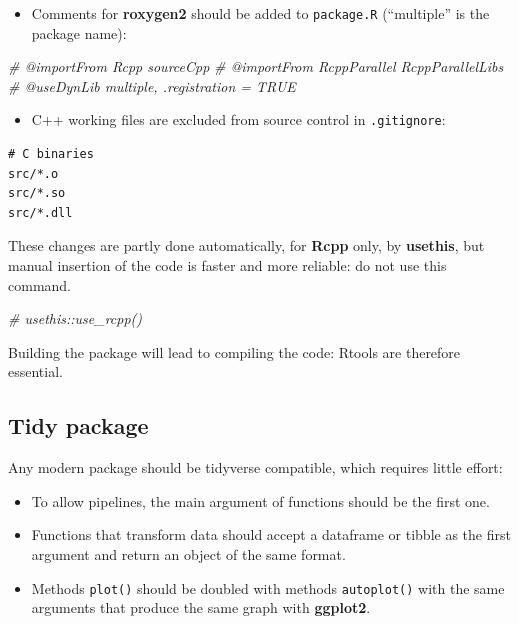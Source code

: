 \documentclass[
  12pt,
  american,
  a4paper,
  extrafontsizes,onecolumn,openright
  ]{memoir}
\newenvironment{Shaded}{\begin{snugshade}}{\end{snugshade}}
\newcommand{\CommentTok}[1]{\textcolor[rgb]{0.56,0.35,0.01}{\textit{#1}}}
\providecommand{\tightlist}{%
  \setlength{\itemsep}{0pt}\setlength{\parskip}{0pt}}
\begin{document}
\begin{itemize}
\tightlist
\item
  Comments for \textbf{roxygen2} should be added to \texttt{package.R} (\enquote{multiple} is the package name):
\end{itemize}

\scriptsize

\begin{Shaded}
\begin{Highlighting}[]
\CommentTok{\#\textquotesingle{} @importFrom Rcpp sourceCpp}
\CommentTok{\#\textquotesingle{} @importFrom RcppParallel RcppParallelLibs}
\CommentTok{\#\textquotesingle{} @useDynLib multiple, .registration = TRUE}
\end{Highlighting}
\end{Shaded}

\normalsize

\begin{itemize}
\tightlist
\item
  C++ working files are excluded from source control in \texttt{.gitignore}:
\end{itemize}

\begin{verbatim}
# C binaries
src/*.o
src/*.so
src/*.dll
\end{verbatim}

These changes are partly done automatically, for \textbf{Rcpp} only, by \textbf{usethis}, but manual insertion of the code is faster and more reliable: do not use this command.

\scriptsize

\begin{Shaded}
\begin{Highlighting}[]
\CommentTok{\# usethis::use\_rcpp()}
\end{Highlighting}
\end{Shaded}

\normalsize

Building the package will lead to compiling the code: Rtools are therefore essential.

\subsection{Tidy package}\label{tidy-package}

Any modern package should be tidyverse compatible, which requires little effort:

\begin{itemize}
\tightlist
\item
  To allow pipelines, the main argument of functions should be the first one.
\item
  Functions that transform data should accept a dataframe or tibble as the first argument and return an object of the same format.
\item
  Methods \texttt{plot()} should be doubled with methods \texttt{autoplot()} with the same arguments that produce the same graph with \textbf{ggplot2}.
\end{itemize}
\end{document}
